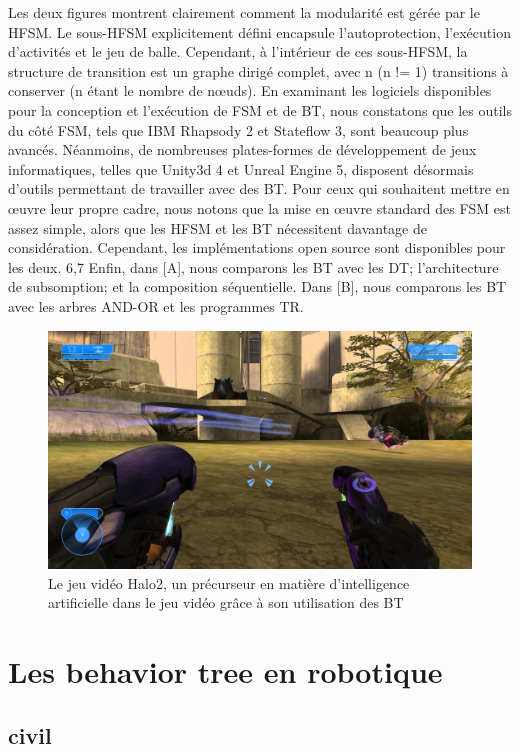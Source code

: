 \documentclass[titlepage]{article}
\begin{document}
			Les deux figures montrent clairement comment la modularité est gérée par le HFSM. Le sous-HFSM explicitement défini encapsule l'autoprotection, l'exécution d'activités et le jeu de balle. Cependant, à l'intérieur de ces sous-HFSM, la structure de transition est un graphe dirigé complet, avec n (n != 1) transitions à conserver (n étant le nombre de nœuds).
			En examinant les logiciels disponibles pour la conception et l'exécution de FSM et de BT, nous constatons que les outils du côté FSM, tels que IBM Rhapsody 2 et Stateflow 3, sont beaucoup plus avancés. Néanmoins, de nombreuses plates-formes de développement de jeux informatiques, telles que Unity3d 4 et Unreal Engine 5, disposent désormais d'outils permettant de travailler avec des BT. Pour ceux qui souhaitent mettre en œuvre leur propre cadre, nous notons que la mise en œuvre standard des FSM est assez simple, alors que les HFSM et les BT nécessitent davantage de considération. Cependant, les implémentations open source sont disponibles pour les deux. 6,7 Enfin, dans [A], nous comparons les BT avec les DT; l'architecture de subsomption; et la composition séquentielle. Dans [B], nous comparons les BT avec les arbres AND-OR et les programmes TR.
	\begin{figure}[h!]
		\includegraphics[width=\linewidth]{img/halo2.jpg}
		\caption{Le jeu vidéo Halo2, un précurseur en matière d'intelligence artificielle dans le jeu vidéo grâce à son utilisation des BT \cite{wikipedia_halo}}
		\label{fig:BT1}
	\end{figure}
	
	\clearpage
	\section{Les behavior tree en robotique}
		\subsection{civil}
	
\end{document}
